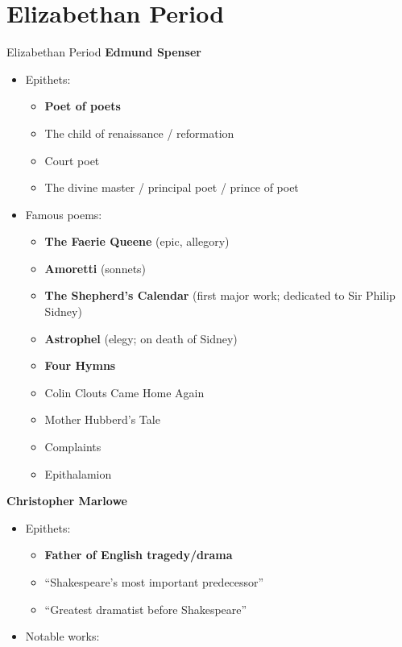 \documentclass[
  12pt,
    progressbar=frametitle]{beamer}
\providecommand{\tightlist}{%
  \setlength{\itemsep}{0pt}\setlength{\parskip}{0pt}}
\begin{document}
\section{Elizabethan Period}
\begin{frame}[allowframebreaks]
{Elizabethan Period}
\large\textbf{Edmund Spenser}\normalsize\vspace{-3mm}

\begin{itemize}
\tightlist
\item
  Epithets:

  \begin{itemize}
  \tightlist
  \item
    \textbf{Poet of poets}
  \item
    The child of renaissance / reformation
  \item
    Court poet
  \item
    The divine master / principal poet / prince of poet
  \end{itemize}
\item
  Famous poems:

  \begin{itemize}
  \tightlist
  \item
    \textbf{The Faerie Queene} (epic, allegory)
  \item
    \textbf{Amoretti} (sonnets)
  \item
    \textbf{The Shepherd's Calendar} (first major work; dedicated to Sir
    Philip Sidney)
  \item
    \textbf{Astrophel} (elegy; on death of Sidney)
  \item
    \textbf{Four Hymns}
  \item
    Colin Clouts Came Home Again
  \item
    Mother Hubberd's Tale
  \item
    Complaints
  \item
    Epithalamion
  \end{itemize}
\end{itemize}

\vspace{12mm}
\large\textbf{Christopher Marlowe}\normalsize\vspace{-3mm}

\begin{itemize}
\tightlist
\item
  Epithets:

  \begin{itemize}
  \tightlist
  \item
    \textbf{Father of English tragedy/drama}
  \item
    ``Shakespeare's most important predecessor''
  \item
    ``Greatest dramatist before Shakespeare''
  \end{itemize}
\item
  Notable works:
\end{itemize}


\end{frame}
\end{document}
